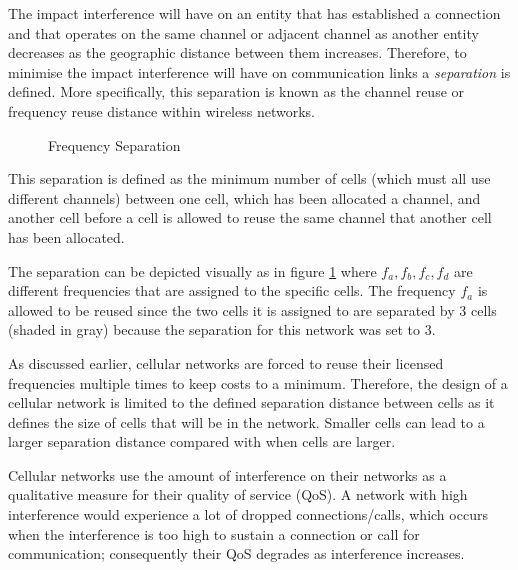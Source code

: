 The impact interference will have on an entity that has established a connection and that operates on the same channel or adjacent channel as another entity decreases as the geographic distance between them increases\cite{WirelessCommunications,WirelessDigitalCommunications,Eisenblatter,InterferenceOrientatedFAP}. Therefore, to minimise the impact interference will have on communication links a \emph{separation} is defined\cite{WirelessCommunications,WirelessDigitalCommunications,Eisenblatter,InterferenceOrientatedFAP}. More specifically, this separation is known as the channel reuse or frequency reuse distance within wireless networks\cite{WirelessCommunications,WirelessDigitalCommunications,Eisenblatter,InterferenceOrientatedFAP}.

\begin{figure}[t!]
	\begin{centering}
	
	\caption{Frequency Separation}
	\label{fig:seperationgraph}
	\end{centering}
\end{figure}

This separation is defined as the minimum number of cells (which must all use different channels) between one cell, which has been allocated a channel, and another cell before a cell is allowed to reuse the same channel that another cell has been allocated\cite{WirelessCommunications,WirelessDigitalCommunications,Eisenblatter,InterferenceOrientatedFAP}. 

The separation can be depicted visually as in figure \ref{fig:seperationgraph} where $f_a,f_b,f_c,f_d$ are different frequencies that are assigned to the specific cells. The frequency $f_a$ is allowed to be reused since the two cells it is assigned to are separated by 3 cells (shaded in gray) because the separation for this network was set to 3.

As discussed earlier, cellular networks are forced to reuse their licensed frequencies multiple times to keep costs to a minimum. Therefore, the design of a cellular network is limited to the defined separation distance between cells as it defines the size of cells that will be in the network. Smaller cells can lead to a larger separation distance compared with when cells are larger\cite{WirelessCommunications,WirelessDigitalCommunications,Eisenblatter,InterferenceOrientatedFAP}.

Cellular networks use the amount of interference on their networks as a qualitative measure for their quality of service (QoS). A network with high interference would experience a lot of dropped connections/calls, which occurs when the interference is too high to sustain a connection or call for communication; consequently their QoS degrades as interference increases\cite{WirelessCommunications,WirelessDigitalCommunications}.

